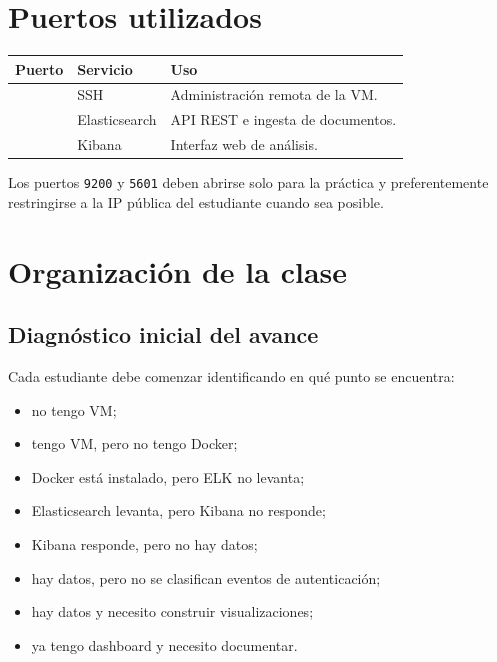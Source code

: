 \documentclass[
  coursetitle={Cómputo Nube y Tecnologías Emergentes},
  coursehours={96},
  coursedate={Verano 2026},
  doctype={Práctica},
  otherlangs={english,french},
  authorname={Lázaro},
  authorsurname={Bustio-Martínez},
  authortitle={PhD},
  role={Profesor Investigador},
  email={lbustio@inaoe.mx},
  phone={5559504000},
  ext={7459},
  institution={Instituto Nacional de Astrofísica, Óptica y Electrónica (INAOE)},
  department={Maestría en Ciencias en Tecnologías de Seguridad},
  address={Luis Enrique Erro 1, Sta. Ma. Tonantzintla, San Andrés Cholula, CP 72840, Puebla, México},
  margin={0.5in}
]{../../lbustio_lecture_notes}
\begin{document}
\section{Puertos utilizados}

\begin{center}
\begin{tabularx}{0.95\textwidth}{|>{\centering\arraybackslash}p{}|>{\raggedright\arraybackslash}p{}|>{\raggedright\arraybackslash}X|}
\hline
\textbf{Puerto} & \textbf{Servicio} & \textbf{Uso} \\
\hline
22 & SSH & Administración remota de la VM. \\
\hline
9200 & Elasticsearch & API REST e ingesta de documentos. \\
\hline
5601 & Kibana & Interfaz web de análisis. \\
\hline
\end{tabularx}
\end{center}

Los puertos \texttt{9200} y \texttt{5601} deben abrirse solo para la práctica y preferentemente restringirse a la IP pública del estudiante cuando sea posible.

\section{Organización de la clase}

\subsection{Diagnóstico inicial del avance}

Cada estudiante debe comenzar identificando en qué punto se encuentra:

\begin{itemize}
    \item no tengo VM;
    \item tengo VM, pero no tengo Docker;
    \item Docker está instalado, pero ELK no levanta;
    \item Elasticsearch levanta, pero Kibana no responde;
    \item Kibana responde, pero no hay datos;
    \item hay datos, pero no se clasifican eventos de autenticación;
    \item hay datos y necesito construir visualizaciones;
    \item ya tengo dashboard y necesito documentar.
\end{itemize}
\end{document}
